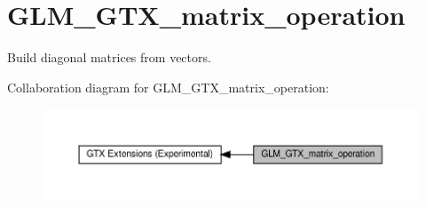 \hypertarget{group__gtx__matrix__operation}{}\section{G\+L\+M\+\_\+\+G\+T\+X\+\_\+matrix\+\_\+operation}
\label{group__gtx__matrix__operation}


Build diagonal matrices from vectors.  


Collaboration diagram for G\+L\+M\+\_\+\+G\+T\+X\+\_\+matrix\+\_\+operation\+:\nopagebreak
\begin{figure}[H]
\begin{center}
\leavevmode
\includegraphics[width=350pt]{group__gtx__matrix__operation}
\end{center}
\end{figure}
